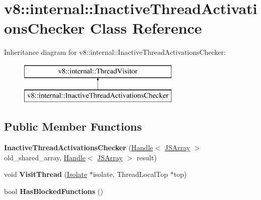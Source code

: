 \hypertarget{classv8_1_1internal_1_1_inactive_thread_activations_checker}{}\section{v8\+:\+:internal\+:\+:Inactive\+Thread\+Activations\+Checker Class Reference}
\label{classv8_1_1internal_1_1_inactive_thread_activations_checker}
Inheritance diagram for v8\+:\+:internal\+:\+:Inactive\+Thread\+Activations\+Checker\+:\begin{figure}[H]
\begin{center}
\leavevmode
\includegraphics[height=2.000000cm]{classv8_1_1internal_1_1_inactive_thread_activations_checker}
\end{center}
\end{figure}
\subsection*{Public Member Functions}
\begin{DoxyCompactItemize}
\item 
{\bfseries Inactive\+Thread\+Activations\+Checker} (\hyperlink{classv8_1_1internal_1_1_handle}{Handle}$<$ \hyperlink{classv8_1_1internal_1_1_j_s_array}{J\+S\+Array} $>$ old\+\_\+shared\+\_\+array, \hyperlink{classv8_1_1internal_1_1_handle}{Handle}$<$ \hyperlink{classv8_1_1internal_1_1_j_s_array}{J\+S\+Array} $>$ result)\hypertarget{classv8_1_1internal_1_1_inactive_thread_activations_checker_a23ee11cee6f7dea3d1480ff5be038ab3}{}\label{classv8_1_1internal_1_1_inactive_thread_activations_checker_a23ee11cee6f7dea3d1480ff5be038ab3}

\item 
void {\bfseries Visit\+Thread} (\hyperlink{classv8_1_1internal_1_1_isolate}{Isolate} $\ast$isolate, Thread\+Local\+Top $\ast$top)\hypertarget{classv8_1_1internal_1_1_inactive_thread_activations_checker_a15193de7d26efb218fb033844f3e3f30}{}\label{classv8_1_1internal_1_1_inactive_thread_activations_checker_a15193de7d26efb218fb033844f3e3f30}

\item 
bool {\bfseries Has\+Blocked\+Functions} ()\hypertarget{classv8_1_1internal_1_1_inactive_thread_activations_checker_a00e3f278075d637296a226c702904aec}{}\label{classv8_1_1internal_1_1_inactive_thread_activations_checker_a00e3f278075d637296a226c702904aec}

\end{DoxyCompactItemize}
